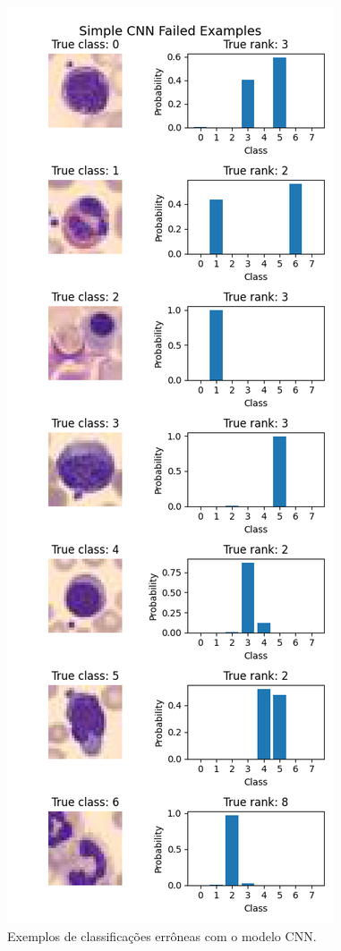 \documentclass[final,5p]{elsarticle}
\numberwithin{equation}{section}
\begin{document}
\begin{figure}[H]
    \includegraphics[width=0.8\columnwidth]{CNN_Simple_fails.png}
    \caption{Exemplos de classificações errôneas com o modelo CNN.}\label{fig:ErrosCNN}
\end{figure}
\end{document}
